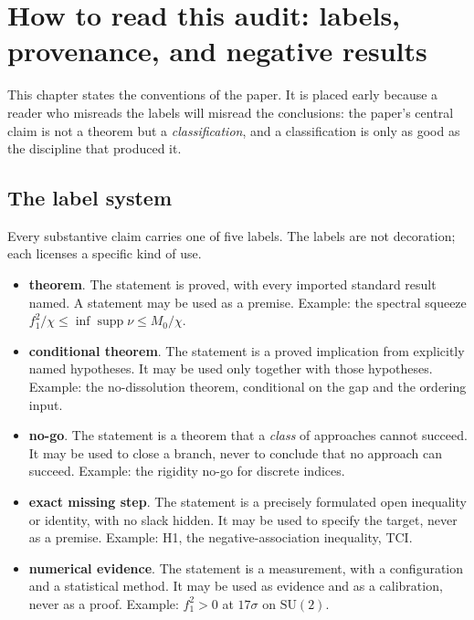 \section{How to read this audit: labels, provenance, and negative results}

\figloop

\figlabelmap
\label{ch:method}

This chapter states the conventions of the paper. It is placed early because a reader who
misreads the labels will misread the conclusions: the paper's central claim is not a theorem but
a \emph{classification}, and a classification is only as good as the discipline that produced it.

\subsection{The label system}

Every substantive claim carries one of five labels. The labels are not decoration; each licenses a
specific kind of use.

\begin{itemize}
\item \LT{} \textbf{theorem}. The statement is proved, with every imported standard result
  named. A \LT{} statement may be used as a premise. Example: the spectral squeeze
  $f_1^2/\chi\le\inf\operatorname{supp}\nu\le M_0/\chi$.
\item \LC{} \textbf{conditional theorem}. The statement is a proved implication from explicitly
  named hypotheses. It may be used only together with those hypotheses. Example: the
  no-dissolution theorem, conditional on the gap and the ordering input.
\item \LN{} \textbf{no-go}. The statement is a theorem that a \emph{class} of approaches cannot
  succeed. It may be used to close a branch, never to conclude that no approach can succeed.
  Example: the rigidity no-go for discrete indices.
\item \LM{} \textbf{exact missing step}. The statement is a precisely formulated open
  inequality or identity, with no slack hidden. It may be used to specify the target, never as a
  premise. Example: H1, the negative-association inequality, TCI.
\item \LE{} \textbf{numerical evidence}. The statement is a measurement, with a configuration
  and a statistical method. It may be used as evidence and as a calibration, never as a proof.
  Example: $f_1^2>0$ at $17\sigma$ on $\mathrm{SU}(2)$.
\end{itemize}

